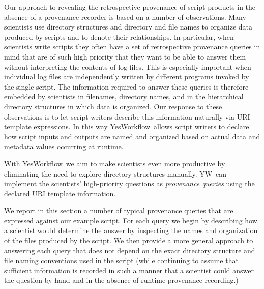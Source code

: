 \documentclass[letterpaper,twocolumn,10pt]{article}
\newcommand{\YW}{\textsf{YesWorkflow}}
\newcommand{\yw}{\textsf{YW}}
\begin{document}
Our approach to revealing the retrospective provenance of script
products in the absence of a provenance recorder is based on a number
of observations. Many scientists use directory structures and
directory and file names to organize data produced by scripts and to
denote their relationships. In particular, when scientists write
scripts they often have a set of retrospective provenance queries in
mind that are of such high priority that they want to be able to
answer them without interpreting the contents of log files. This is
especially important when individual log files are independently
written by different programs invoked by the single script.  The
information required to answer these queries is therefore embedded by
scientists in filenames, directory names, and in the hierarchical
directory structures in which data is organized.  Our response to
these observations is to let script writers describe this information
naturally via URI template expressions. In this way \YW\ allows script
writers to declare how script inputs and outputs are named and
organized based on actual data and metadata values occurring at
runtime.

With \YW\ we aim to make scientists even more productive by
eliminating the need to explore directory structures manually.  \yw\
can implement the scientists' high-priority questions as
\emph{provenance queries} using the declared URI template information.


We report in this section a number of typical provenance queries that
are expressed against our example script. For each query we begin by
describing how a scientist would determine the answer by inspecting
the names and organization of the files produced by the script. We
then provide a more general approach to answering each query that does
not depend on the exact directory structure and file naming
conventions used in the script (while continuing to assume that
sufficient information is recorded in such a manner that a scientist
could answer the question by hand and in the absence of runtime
provenance recording.) 
\end{document}
